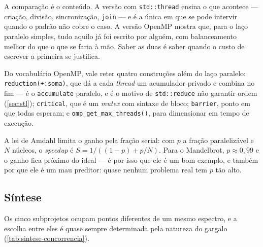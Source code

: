 \begin{porque}
A comparação é o conteúdo. A versão com \texttt{std::thread} ensina o que
acontece --- criação, divisão, sincronização, \texttt{join} --- e é a única em
que se pode intervir quando o padrão não cobre o caso. A versão OpenMP mostra
que, para o laço paralelo simples, tudo aquilo já foi escrito por alguém, com
balanceamento melhor do que o que se faria à mão. Saber as duas é saber quando o
custo de escrever a primeira se justifica.
\end{porque}

Do vocabulário OpenMP, vale reter quatro construções além do laço paralelo:
\texttt{reduction(+:soma)}, que dá a cada \emph{thread} um acumulador privado e
combina no fim --- é o \texttt{accumulate} paralelo, e é o motivo de
\texttt{std::reduce} não garantir ordem (\cref{sec:stl});
\texttt{critical}, que é um \emph{mutex} com sintaxe de bloco;
\texttt{barrier}, ponto em que todas esperam; e
\texttt{omp\_get\_max\_threads()}, para dimensionar em tempo de execução.

\begin{regra}
A lei de Amdahl limita o ganho pela fração serial: com $p$ a fração
paralelizável e $N$ núcleos, o \emph{speedup} é
$S = 1 / \left((1-p) + p/N\right)$. Para o Mandelbrot, $p \approx 0{,}99$ e o
ganho fica próximo do ideal --- é por isso que ele é um bom exemplo, e também
por que ele é um mau preditor: quase nenhum problema real tem $p$ tão alto.
\end{regra}

\subsection{Síntese}

Os cinco subprojetos ocupam pontos diferentes de um mesmo espectro, e a escolha
entre eles é quase sempre determinada pela natureza do gargalo
(\cref{tab:sintese-concorrencia}).

